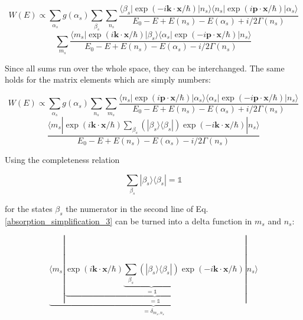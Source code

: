 \documentclass{article}
\begin{document}
\begin{equation}
\label{absorption_simplification_2}
	W (E) \propto \sum_{\alpha_s} g(\alpha_s) \sum_{\beta_s} \sum_{n_s} \frac{ \langle \beta_s | \exp{\left( - i \mathbf{k} \cdot \mathbf{x} / \hbar \right)} | n_s \rangle \langle n_s | \exp{\left( i \mathbf{p} \cdot \mathbf{x} / \hbar \right)} | \alpha_s \rangle  }{E_0 - E + E(n_s) - E(\alpha_s) + i/2 \Gamma(n_s)} 
\end{equation}	
\begin{equation*}
\sum_{m_s} \frac{ \langle m_s | \exp{\left( i \mathbf{k} \cdot \mathbf{x} / \hbar \right)} | \beta_s \rangle \langle \alpha_s | \exp{\left(  - i \mathbf{p} \cdot \mathbf{x} / \hbar \right)} | n_s \rangle  }{E_0 - E + E(n_s) - E(\alpha_s) - i/2 \Gamma(n_s)}
\end{equation*}

Since all sums run over the whole space, they can be interchanged. 
The same holds for the matrix elements which are simply numbers:

\begin{equation}
\label{absorption_simplification_3}
	W (E) \propto \sum_{\alpha_s} g(\alpha_s) \sum_{n_s} \sum_{m_s} \frac{  \langle n_s | \exp{\left( i \mathbf{p} \cdot \mathbf{x} / \hbar \right)} | \alpha_s \rangle \langle \alpha_s | \exp{\left(  - i \mathbf{p} \cdot \mathbf{x} / \hbar \right)} | n_s \rangle  }{E_0 - E + E(n_s) - E(\alpha_s) + i/2 \Gamma(n_s)} 
\end{equation}	
\begin{equation*}
	\frac{ \langle m_s | \exp{\left( i \mathbf{k} \cdot \mathbf{x} / \hbar \right)} \sum_{\beta_s} \left( | \beta_s \rangle \langle \beta_s | \right) \exp{\left( - i \mathbf{k} \cdot \mathbf{x} / \hbar \right)} | n_s \rangle }{E_0 - E + E(n_s) - E(\alpha_s) - i/2 \Gamma(n_s)}
\end{equation*}

Using the completeness relation

\begin{equation}
	\label{completeness_relation_system}
	\sum_{\beta_s} | \beta_s \rangle \langle \beta_s | = \mathbb{1}
\end{equation}

for the states $\beta_s$ the numerator in the second line of Eq. \ref{absorption_simplification_3} can be turned into a delta function in $m_s$ and $n_s$:

\begin{equation}
	\label{absorption_simplification_4}
	\underbrace{\langle m_s | \underbrace{\exp{\left( i \mathbf{k} \cdot \mathbf{x} / \hbar \right)} \underbrace{\sum_{\beta_s} \left( | \beta_s \rangle \langle \beta_s | \right)}_{ = \mathbb{1}} \exp{\left( - i \mathbf{k} \cdot \mathbf{x} / \hbar \right)} }_{ = \mathbb{1}} | n_s \rangle }_{ = \delta_{m_s, n_s}}
\end{equation}
\end{document}
